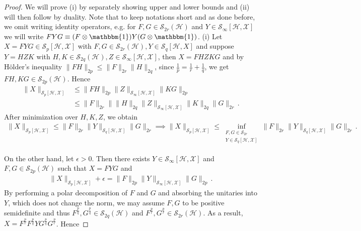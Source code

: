 \documentclass[11pt]{article}
\newcommand{\1}{\ensuremath{\mathbbm{1}}}
\theoremstyle{newdefinition}
\theoremstyle{newplain}
\theoremstyle{myplain}
\begin{document}
\begin{proof}
We will prove (i) by separately showing upper and lower bounds and (ii) will then follow by duality. 
Note that to keep notations short and as done before, we omit writing identity operators, e.g. for $F,G\in \mathcal{S}_{2r}(\mathcal{H})$ and $Y\in \mathcal{S}_\infty[\mathcal{H},\mathcal{X}]$ we will write $FYG\equiv(F\otimes\1)Y(G\otimes\1)$. 
\medskip 
    (i) Let $X=FYG\in \mathcal{S}_p[\mathcal{H},\mathcal{X}]$ with $F,G\in \mathcal{S}_{2r}(\mathcal{H}),Y\in \mathcal{S}_q[\mathcal{H},X]$ and suppose $Y=HZK$ with $H,K\in \mathcal{S}_{2q}(\mathcal{H}), Z\in \mathcal{S}_\infty[\mathcal{H},{\mathcal{X}}]$, then $X=FH Z KG$ and by H\"{o}lder's inequality $\|FH\|_{2p}\leq \|F\|_{2r}\|H\|_{2q}$, since $\frac{1}{p}=\frac{1}{r}+\frac{1}{q}$, we get $FH,KG\in \mathcal{S}_{2p}(\mathcal{H})$. Hence
    \begin{align}
\|X\|_{\mathcal{S}_p[\mathcal{H},\mathcal{X}]}&\leq \|FH\|_{2p}\|Z\|_{\mathcal{S}_\infty[\mathcal{H},\mathcal{X}]}\|KG\|_{2p} \\&\leq \|F\|_{2r}\|\|H\|_{2q}\|Z\|_{\mathcal{S}_\infty[\mathcal{H},\mathcal{X}]}\|K\|_{2q}\|G\|_{2r}\,.
    \end{align} 
     After minimization over $H,K,Z$, we obtain
    \begin{align}
\|X\|_{\mathcal{S}_p[\mathcal{H},\mathcal{X}]} \leq \|F\|_{2r}\|Y\|_{\mathcal{S}_q[\mathcal{H},\mathcal{X}]}\|G\|_{2r} \implies  \|X\|_{\mathcal{S}_p[\mathcal{H},\mathcal{X}]} \leq \inf_{\substack{F,G\in \mathcal{S}_{2r}\\Y\in \mathcal{S}_q[\mathcal{H},\mathcal{X}]}}\|F\|_{2r}\|Y\|_{\mathcal{S}_q[\mathcal{H},\mathcal{X}]}\|G\|_{2r}\,.
    \end{align}

    On the other hand, let $\epsilon>0$. Then there exists $Y\in \mathcal{S}_\infty[\mathcal{H},\mathcal{X}]$ and $F,G\in \mathcal{S}_{2p}(\mathcal{H})$ such that $X=FYG$ and 
    \begin{align}
\|X\|_{\mathcal{S}_p[\mathcal{H},\mathcal{X}]}+\epsilon=\|F\|_{2p}\|Y\|_{\mathcal{S}_\infty[\mathcal{H},\mathcal{X}]}\|G\|_{2p}\,.
    \end{align}
    By performing a polar decomposition of $F$ and $G$ and absorbing the unitaries into $Y$, which does not change the norm, we may assume $F,G$ to be positive semidefinite and thus $F^{\frac{p}{q}},G^{\frac{p}{q}}\in \mathcal{S}_{2q}(\mathcal{H})$ and $F^{\frac{p}{r}},G^{\frac{p}{r}}\in \mathcal{S}_{2r}(\mathcal{H})$. As a result, $X = F^{\frac{p}{r}} F^{\frac{p}{q}} Y G^{\frac{p}{q}} G^{\frac{p}{r}}$. Hence


\end{proof}
\end{document}
